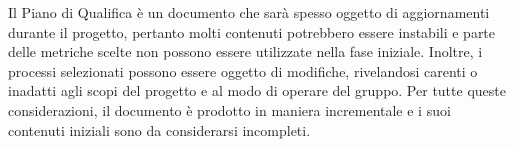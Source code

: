 Il Piano di Qualifica è un documento che sarà spesso 
oggetto di aggiornamenti durante il progetto, pertanto molti contenuti 
potrebbero essere instabili e parte delle metriche
scelte non possono essere utilizzate nella fase iniziale.
Inoltre, i processi selezionati possono essere oggetto di modifiche, rivelandosi carenti o inadatti agli scopi del progetto
 e al modo di operare del gruppo. 
Per tutte queste considerazioni, il documento è prodotto in maniera incrementale e i suoi contenuti iniziali sono 
da considerarsi incompleti.
